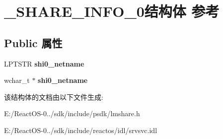 \hypertarget{struct___s_h_a_r_e___i_n_f_o__0}{}\section{\+\_\+\+S\+H\+A\+R\+E\+\_\+\+I\+N\+F\+O\+\_\+0结构体 参考}
\label{struct___s_h_a_r_e___i_n_f_o__0}
\subsection*{Public 属性}
\begin{DoxyCompactItemize}
\item 
\mbox{\label{struct___s_h_a_r_e___i_n_f_o__0_aa1dda5daf9faaac3e5c31df046909f80}} 
L\+P\+T\+S\+TR {\bfseries shi0\+\_\+netname}
\item 
\mbox{\label{struct___s_h_a_r_e___i_n_f_o__0_a163429e3d3a32e0812784e6b67b1a13b}} 
wchar\+\_\+t $\ast$ {\bfseries shi0\+\_\+netname}
\end{DoxyCompactItemize}


该结构体的文档由以下文件生成\+:\begin{DoxyCompactItemize}
\item 
E\+:/\+React\+O\+S-\/0../sdk/include/psdk/lmshare.\+h\item 
E\+:/\+React\+O\+S-\/0../sdk/include/reactos/idl/srvsvc.\+idl\end{DoxyCompactItemize}
